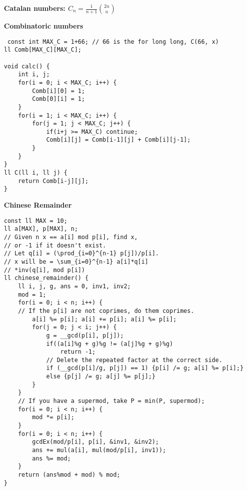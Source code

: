 \documentclass[a4paper,10pt]{article}
\newcommand{\titleAlg}[1]{\vspace{-10pt}
\begin{center}\textbf{#1}\end{center} \vspace{-10pt}}
\begin{document}
\titleAlg{Catalan numbers: $C_n=\frac{1}{n+1}\binom{2n}{n}$}
\vspace{15pt}
 \titleAlg{Combinatoric numbers}
 \begin{multicols}{2}
 \begin{verbatim}
 const int MAX_C = 1+66; // 66 is the for long long, C(66, x)
ll Comb[MAX_C][MAX_C];

void calc() {
    int i, j;
    for(i = 0; i < MAX_C; i++) {
        Comb[i][0] = 1;
        Comb[0][i] = 1;
    }
    for(i = 1; i < MAX_C; i++) {
        for(j = 1; j < MAX_C; j++) {
            if(i+j >= MAX_C) continue;
            Comb[i][j] = Comb[i-1][j] + Comb[i][j-1];
        }
    }
}
ll C(ll i, ll j) {
    return Comb[i-j][j];
}
\end{verbatim}
\end{multicols}

\titleAlg{Chinese Remainder}
 \begin{multicols}{2}
\begin{verbatim}
const ll MAX = 10;
ll a[MAX], p[MAX], n;
// Given n x == a[i] mod p[i], find x, 
// or -1 if it doesn't exist.
// Let q[i] = (\prod_{i=0}^{n-1} p[j])/p[i].
// x will be = \sum_{i=0}^{n-1} a[i]*q[i]
// *inv(q[i], mod p[i])
ll chinese_remainder() {
    ll i, j, g, ans = 0, inv1, inv2;
    mod = 1;
    for(i = 0; i < n; i++) { 
    // If the p[i] are not coprimes, do them coprimes.
        a[i] %= p[i]; a[i] += p[i]; a[i] %= p[i];
        for(j = 0; j < i; j++) {
            g = __gcd(p[i], p[j]);
            if((a[i]%g + g)%g != (a[j]%g + g)%g) 
                return -1;
            // Delete the repeated factor at the correct side.
            if (__gcd(p[i]/g, p[j]) == 1) {p[i] /= g; a[i] %= p[i];}
            else {p[j] /= g; a[j] %= p[j];}
        }
    }
    // If you have a supermod, take P = min(P, supermod);
    for(i = 0; i < n; i++) {
        mod *= p[i];
    }
    for(i = 0; i < n; i++) {
        gcdEx(mod/p[i], p[i], &inv1, &inv2);
        ans += mul(a[i], mul(mod/p[i], inv1));
        ans %= mod;
    }
    return (ans%mod + mod) % mod;
}
\end{verbatim}
\end{multicols}
\end{document}
